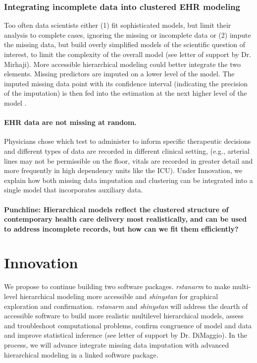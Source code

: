 \documentclass[11pt,notitlepage]{article}
\begin{document}
\section*{Integrating incomplete data into clustered EHR modeling}
Too often data scientists either (1) fit sophisticated models, but limit their analysis 
to complete cases, ignoring the missing or incomplete data or (2) impute the missing 
data, but build overly simplified models of the scientific question of interest, 
to limit the complexity of the overall model (see letter of support by Dr. Mirhaji). 
More accessible hierarchical modeling could better integrate the two elements. 
Missing predictors are imputed on a lower level of the model. The imputed missing 
data point with its confidence interval (indicating the precision of the imputation) 
is then fed into the estimation at the next higher level of the model
 \cite{Gelman2001imputation}. 

\subsection*{EHR data are not missing at random.}
Physicians chose which test 
to administer 
to inform specific therapeutic decisions and different types of data are recorded 
in different clinical setting, (e.g., arterial lines may not be permissible on the 
floor, vitals are recorded in greater detail and more frequently in high dependency 
units like the ICU). Under Innovation, we explain  how both missing data 
imputation and clustering can be integrated into a single model that 
incorporates auxiliary data.

\subsection*{Punchline: Hierarchical models reflect the clustered structure of contemporary health care 
delivery most realistically, and can be used to address incomplete records, but how can we fit them efficiently?}

\part*{Innovation}

We propose to continue building two software packages. \textit{rstanarm} to make 
multi-level hierarchical modeling more accessible and \textit{shinystan} 
for graphical exploration and confirmation. \textit{rstanarm} and 
\textit{shinystan} will address the dearth of accessible software 
to build more realistic multilevel hierarchical models, assess and 
troubleshoot computational problems, confirm congruence of model and data 
and improve statistical inference (see letter of support by Dr. DiMaggio). 
In the process, we will advance integrate missing data imputation with 
advanced hierarchical modeling in a linked software package.  
\end{document}

